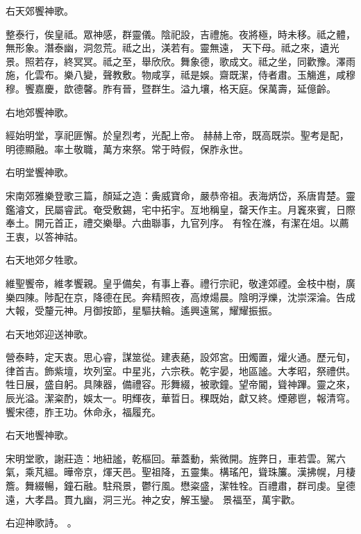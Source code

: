 \begin{pinyinscope}
 右天郊饗神歌。



 整泰行，俟皇祗。眾神感，群靈儀。陰祀設，吉禮施。夜將極，時未移。祗之體，無形象。潛泰幽，洞忽荒。祗之出，渼若有。靈無遠，
 天下母。祗之來，遺光景。照若存，終冥冥。祗之至，舉欣欣。舞象德，歌成文。祗之坐，同歡豫。澤雨施，化雲布。樂八變，聲教敷。物咸享，祗是娛。齋既潔，侍者肅。玉觴進，咸穆穆。饗嘉慶，歆德馨。胙有晉，暨群生。溢九壤，格天庭。保萬壽，延億齡。



 右地郊饗神歌。



 經始明堂，享祀匪懈。於皇烈考，光配上帝。
 赫赫上帝，既高既崇。聖考是配，明德顯融。率土敬職，萬方來祭。常于時假，保胙永世。



 右明堂饗神歌。



 宋南郊雅樂登歌三篇，顏延之造：夤威寶命，嚴恭帝祖。表海炳岱，系唐胄楚。靈鑑濬文，民屬睿武。奄受敷錫，宅中拓宇。亙地稱皇，罄天作主。月竁來賓，日際奉土。開元首正，禮交樂舉。六曲聯事，九官列序。
 有牷在滌，有潔在俎。以薦王衷，以答神祜。



 右天地郊夕牲歌。



 維聖饗帝，維孝饗親。皇乎備矣，有事上春。禮行宗祀，敬達郊禋。金枝中樹，廣樂四陳。陟配在京，降德在民。奔精照夜，高燎煬晨。陰明浮爍，沈崇深淪。告成大報，受釐元神。月御按節，星驅扶輪。遙興遠駕，耀耀振振。



 右天地郊迎送神歌。



 營泰畤，定天衷。思心睿，謀筮從。建表蕝，設郊宮。田燭置，爟火通。歷元旬，律首吉。飾紫壇，坎列室。中星兆，六宗秩。乾宇晏，地區謐。大孝昭，祭禮供。牲日展，盛自躬。具陳器，備禮容。形舞綴，被歌鐘。望帝閽，聳神蹕。靈之來，辰光溢。潔粢酌，娛太一。明輝夜，華晢日。稞既始，獻又終。煙薌鬯，報清穹。饗宋德，胙王功。休命永，福履充。



 右天地饗神歌。



 宋明堂歌，謝莊造：地紐謐，乾樞回。華蓋動，紫微開。旌弊日，車若雲。駕六氣，乘芃縕。曄帝京，煇天邑。聖祖降，五靈集。構瑤戺，聳珠簾。漢拂幌，月棲簷。舞綴暢，鐘石融。駐飛景，鬱行風。懋粢盛，潔牲牷。百禮肅，群司虔。皇德遠，大孝昌。貫九幽，洞三光。神之安，解玉鑾。
 景福至，萬宇歡。


右迎神歌詩。
 。




\end{pinyinscope}
